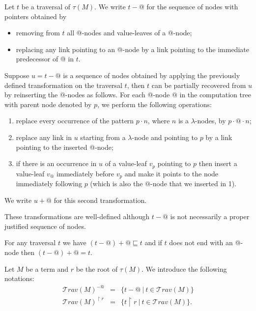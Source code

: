 \documentclass{llncs}
\newcommand\travset{\mathcal{T}rav}
\begin{document}
\begin{definition}
\label{dfn:appnode_filter}
Let $t$ be a traversal of $\tau(M)$.
We write $t-@$ for the sequence of nodes with pointers obtained by
\begin{itemize}
\item removing from $t$ all @-nodes and value-leaves of a @-node;
\item replacing any link pointing to an @-node by a link pointing to the immediate predecessor of @ in $t$.
\end{itemize}

Suppose $u = t-@$ is a sequence of nodes obtained by applying the
previously defined transformation on the traversal $t$, then $t$ can
be partially recovered from $u$ by reinserting the @-nodes as
follows. For each @-node @ in the computation tree with parent node
denoted by $p$, we perform the following operations:
\begin{enumerate}
\item replace every occurrence of the pattern $p \cdot n$, where $n$ is a $\lambda$-nodes,
by $p \cdot @ \cdot n$;
\item replace any link in $u$ starting from a $\lambda$-node and pointing to $p$ by a link pointing to the inserted @-node;
\item if there is an occurrence in $u$ of a value-leaf $v_p$ pointing to $p$ then insert a value-leaf $v_@$
immediately before $v_p$ and make it points to the node immediately
following $p$ (which is also the $@$-node that we inserted in 1).
\end{enumerate}
We write $u+@$ for this second transformation.
\end{definition}
These transformations are well-defined although $t-@$ is not necessarily a proper justified sequence of nodes.

\begin{lemma}
\label{lem:minus_at_plus_at}
For any traversal $t$ we have $(t-@)+@ \sqsubseteq t$ and if $t$ does not end with an @-node then
$(t-@)+@ = t$.
\end{lemma}

Let $M$ be a term and $r$ be the root of $\tau(M)$. We introduce the following notations:
\begin{eqnarray*}
\travset(M)^{-@} &=& \{ t - @ \ | \  t \in \travset(M) \} \\
\travset(M)^{\upharpoonright r} &=& \{ t  \upharpoonright r \ | \  t  \in \travset(M) \} .
\end{eqnarray*}
\end{document}

